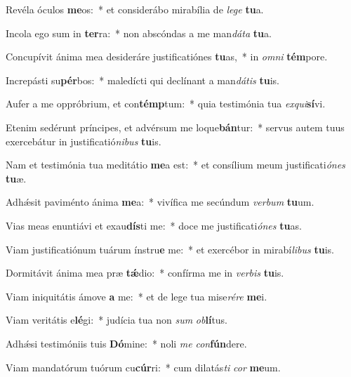 \item Revéla óculos \textbf{me}os:~* et considerábo mirabília de \textit{le}\textit{ge} \textbf{tu}a.
\item Incola ego sum in \textbf{ter}ra:~* non abscóndas a me man\textit{dá}\textit{ta} \textbf{tu}a.
\item Concupívit ánima mea desideráre justificatiónes \textbf{tu}as,~* in \textit{om}\textit{ni} \textbf{tém}pore.
\item Increpásti su\textbf{pér}bos:~* maledícti qui declínant a man\textit{dá}\textit{tis} \textbf{tu}is.
\item Aufer a me oppróbrium, et con\textbf{témp}tum:~* quia testimónia tua \textit{ex}\textit{qui}\textbf{sí}vi.
\item Etenim sedérunt príncipes, et advérsum me loque\textbf{bán}tur:~* servus autem tuus exercebátur in justificatió\textit{ni}\textit{bus} \textbf{tu}is.
\item Nam et testimónia tua meditátio \textbf{me}a est:~* et consílium meum justificati\textit{ó}\textit{nes} \textbf{tu}æ.
\item Adhǽsit paviménto ánima \textbf{me}a:~* vivífica me secúndum \textit{ver}\textit{bum} \textbf{tu}um.
\item Vias meas enuntiávi et exau\textbf{dís}ti me:~* doce me justificati\textit{ó}\textit{nes} \textbf{tu}as.
\item Viam justificatiónum tuárum ínstru\textbf{e} me:~* et exercébor in mirabí\textit{li}\textit{bus} \textbf{tu}is.
\item Dormitávit ánima mea præ \textbf{tǽ}dio:~* confírma me in \textit{ver}\textit{bis} \textbf{tu}is.
\item Viam iniquitátis ámove \textbf{a} me:~* et de lege tua mise\textit{ré}\textit{re} \textbf{me}i.
\item Viam veritátis e\textbf{lé}gi:~* judícia tua non \textit{sum} \textit{ob}\textbf{lí}tus.
\item Adhǽsi testimóniis tuis \textbf{Dó}mine:~* noli \textit{me} \textit{con}\textbf{fún}dere.
\item Viam mandatórum tuórum cu\textbf{cúr}ri:~* cum dilatás\textit{ti} \textit{cor} \textbf{me}um.
